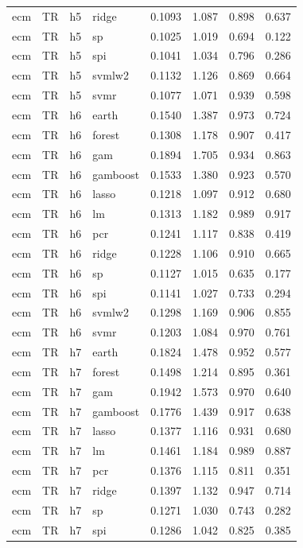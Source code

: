 \begin{ThreePartTable}
\begin{longtable}[t]{llclcccc}
ecm & TR & h5 & ridge & 0.1093 & 1.087 & 0.898 & 0.637\\
ecm & TR & h5 & sp & 0.1025 & 1.019 & 0.694 & 0.122\\
ecm & TR & h5 & spi & 0.1041 & 1.034 & 0.796 & 0.286\\
ecm & TR & h5 & svmlw2 & 0.1132 & 1.126 & 0.869 & 0.664\\
ecm & TR & h5 & svmr & 0.1077 & 1.071 & 0.939 & 0.598\\
\addlinespace
ecm & TR & h6 & earth & 0.1540 & 1.387 & 0.973 & 0.724\\
ecm & TR & h6 & forest & 0.1308 & 1.178 & 0.907 & 0.417\\
ecm & TR & h6 & gam & 0.1894 & 1.705 & 0.934 & 0.863\\
ecm & TR & h6 & gamboost & 0.1533 & 1.380 & 0.923 & 0.570\\
ecm & TR & h6 & lasso & 0.1218 & 1.097 & 0.912 & 0.680\\
ecm & TR & h6 & lm & 0.1313 & 1.182 & 0.989 & 0.917\\
ecm & TR & h6 & pcr & 0.1241 & 1.117 & 0.838 & 0.419\\
ecm & TR & h6 & ridge & 0.1228 & 1.106 & 0.910 & 0.665\\
ecm & TR & h6 & sp & 0.1127 & 1.015 & 0.635 & 0.177\\
ecm & TR & h6 & spi & 0.1141 & 1.027 & 0.733 & 0.294\\
ecm & TR & h6 & svmlw2 & 0.1298 & 1.169 & 0.906 & 0.855\\
ecm & TR & h6 & svmr & 0.1203 & 1.084 & 0.970 & 0.761\\
\addlinespace
ecm & TR & h7 & earth & 0.1824 & 1.478 & 0.952 & 0.577\\
ecm & TR & h7 & forest & 0.1498 & 1.214 & 0.895 & 0.361\\
ecm & TR & h7 & gam & 0.1942 & 1.573 & 0.970 & 0.640\\
ecm & TR & h7 & gamboost & 0.1776 & 1.439 & 0.917 & 0.638\\
ecm & TR & h7 & lasso & 0.1377 & 1.116 & 0.931 & 0.680\\
ecm & TR & h7 & lm & 0.1461 & 1.184 & 0.989 & 0.887\\
ecm & TR & h7 & pcr & 0.1376 & 1.115 & 0.811 & 0.351\\
ecm & TR & h7 & ridge & 0.1397 & 1.132 & 0.947 & 0.714\\
ecm & TR & h7 & sp & 0.1271 & 1.030 & 0.743 & 0.282\\
ecm & TR & h7 & spi & 0.1286 & 1.042 & 0.825 & 0.385\\

\end{longtable}
\end{ThreePartTable}
